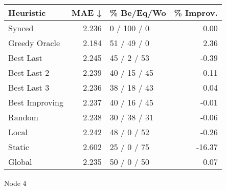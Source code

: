 \begin{tabular}{lrlr}
\toprule
\textbf{Heuristic} & \textbf{MAE ↓} & \textbf{\% Be/Eq/Wo} & \textbf{\% Improv.} \\
\midrule
            Synced &          2.236 &          0 / 100 / 0 &                0.00 \\
     Greedy Oracle &          2.184 &          51 / 49 / 0 &                2.36 \\
         Best Last &          2.245 &          45 / 2 / 53 &               -0.39 \\
       Best Last 2 &          2.239 &         40 / 15 / 45 &               -0.11 \\
       Best Last 3 &          2.236 &         38 / 18 / 43 &                0.04 \\
    Best Improving &          2.237 &         40 / 16 / 45 &               -0.01 \\
            Random &          2.238 &         30 / 38 / 31 &               -0.06 \\
             Local &          2.242 &          48 / 0 / 52 &               -0.26 \\
            Static &          2.602 &          25 / 0 / 75 &              -16.37 \\
            Global &          2.235 &          50 / 0 / 50 &                0.07 \\
\bottomrule
\end{tabular}
\caption{Node 4}
\label{tab:hr_non_lr01_le2_bs2_4}
